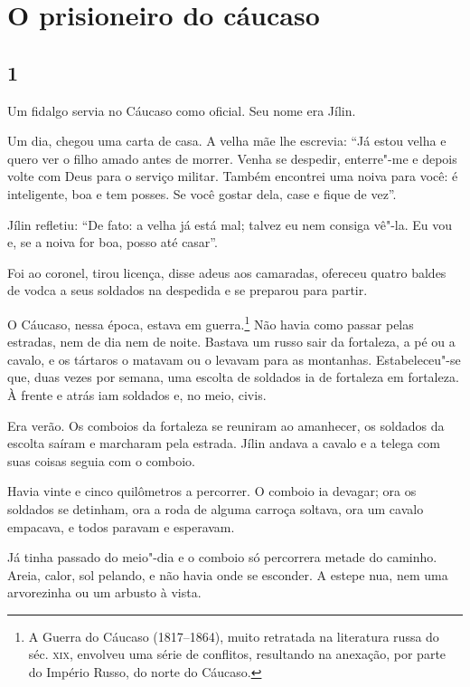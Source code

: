 \chapter{O prisioneiro do cáucaso }

\section{1}

\noindent{}Um fidalgo servia no Cáucaso como oficial. Seu nome era Jílin.

Um dia, chegou uma carta de casa. A velha mãe lhe escrevia: ``Já estou
velha e quero ver o filho amado antes de morrer. Venha se despedir,
enterre"-me e depois volte com Deus para o serviço militar. Também
encontrei uma noiva para você: é inteligente, boa e tem posses. Se você
gostar dela, case e fique de vez''.

Jílin refletiu: ``De fato: a velha já está mal; talvez eu nem consiga
vê"-la. Eu vou e, se a noiva for boa, posso até casar''.

Foi ao coronel, tirou licença, disse adeus aos camaradas, ofereceu
quatro baldes de vodca a seus soldados na despedida e se preparou para
partir.

O Cáucaso, nessa época, estava em guerra.\footnote{A Guerra do Cáucaso
  (1817--1864), muito retratada na literatura russa do séc. \textsc{xix},
  envolveu uma série de conflitos, resultando na anexação, por parte do
  Império Russo, do norte do Cáucaso.} Não havia como passar pelas
estradas, nem de dia nem de noite. Bastava um russo sair da fortaleza, a
pé ou a cavalo, e os tártaros o matavam ou o levavam para as montanhas.
Estabeleceu"-se que, duas vezes por semana, uma escolta de soldados ia de
fortaleza em fortaleza. À frente e atrás iam soldados e, no meio, civis.

Era verão. Os comboios da fortaleza se reuniram ao amanhecer, os
soldados da escolta saíram e marcharam pela estrada. Jílin andava a
cavalo e a telega com suas coisas seguia com o comboio.

Havia vinte e cinco quilômetros a percorrer. O comboio ia devagar; ora
os soldados se detinham, ora a roda de alguma carroça soltava, ora um
cavalo empacava, e todos paravam e esperavam.

Já tinha passado do meio"-dia e o comboio só percorrera metade do
caminho. Areia, calor, sol pelando, e não havia onde se esconder. A
estepe nua, nem uma arvorezinha ou um arbusto à vista.

